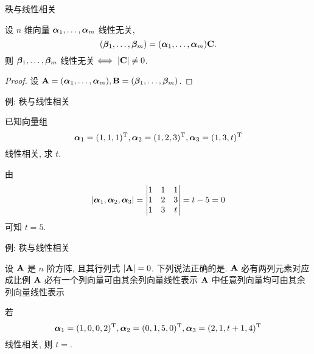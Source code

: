 \begin{frame}{秩与线性相关}
	\onslide<+->
	\begin{proposition}
		设 $n$ 维向量 ${\boldsymbol{\alpha}}_1,\dots,{\boldsymbol{\alpha}}_m$ 线性无关, 
		\[({\boldsymbol{\beta}}_1,\dots,{\boldsymbol{\beta}}_m)=({\boldsymbol{\alpha}}_1,\dots,{\boldsymbol{\alpha}}_m){\mathbf{C}}.\]
		则 ${\boldsymbol{\beta}}_1,\dots,{\boldsymbol{\beta}}_m$ 线性无关$\iff |{\mathbf{C}}|\neq0$.
	\end{proposition}
	\onslide<+->
	\begin{proof}
		设 ${\mathbf{A}}=({\boldsymbol{\alpha}}_1,\dots,{\boldsymbol{\alpha}}_m),{\mathbf{B}}=({\boldsymbol{\beta}}_1,\dots,{\boldsymbol{\beta}}_m)$.
		\onslide<+->{%
		于是命题得证.
		}
	\end{proof}
\end{frame}


\begin{frame}{例: 秩与线性相关}
	\onslide<+->
	\begin{example}
		已知向量组
		\[{\boldsymbol{\alpha}}_1=(1,1,1)^{\mathrm{T}},{\boldsymbol{\alpha}}_2=(1,2,3)^{\mathrm{T}},{\boldsymbol{\alpha}}_3=(1,3,t)^{\mathrm{T}}\]
		线性相关, 求 $t$.
	\end{example}
	\onslide<+->
	\begin{solution}
		由
		\[|{\boldsymbol{\alpha}}_1,{\boldsymbol{\alpha}}_2,{\boldsymbol{\alpha}}_3|=\begin{vmatrix}
			1&1&1\\
			1&2&3\\
			1&3&t
		\end{vmatrix}=t-5=0\]
		可知 $t=5$.
	\end{solution}
\end{frame}


\begin{frame}{例: 秩与线性相关}
	\onslide<+->
	\begin{exercise}
		设 ${\mathbf{A}}$ 是 $n$ 阶方阵, 且其行列式 $|{\mathbf{A}}|=0$. 下列说法正确的是.
		{${\mathbf{A}}$ 必有两列元素对应成比例}%
		{${\mathbf{A}}$ 必有一个列向量可由其余列向量线性表示}%
		{${\mathbf{A}}$ 中任意列向量均可由其余列向量线性表示}
	\end{exercise}
	\onslide<+->
	\begin{exercise}
		若
		\[{\boldsymbol{\alpha}}_1=(1,0,0,2)^{\mathrm{T}},
		{\boldsymbol{\alpha}}_2=(0,1,5,0)^{\mathrm{T}},
		{\boldsymbol{\alpha}}_3=(2,1,t+1,4)^{\mathrm{T}}\]
		线性相关, 则 $t=$\fillblank{\visible<+->{3}}.
	\end{exercise}
\end{frame}


